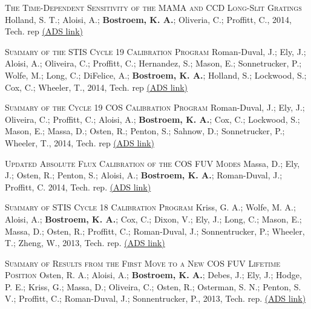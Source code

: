 \begin{revnumerate}[24]
\item{\textsc{The Time-Dependent Sensitivity of the MAMA and CCD Long-Slit Gratings}
Holland, S. T.; Aloisi, A.; {\bf Bostroem, K. A.}; Oliveria, C.; Proffitt, C.,  2014, Tech. rep 
\color{blue}\href{https://ui.adsabs.harvard.edu/#abs/2014stis.rept....2H/abstract}{(ADS link)}\color{black}}\\ %

\item{\textsc{Summary of the STIS Cycle 19 Calibration Program}
Roman-Duval, J.; Ely, J.; Aloisi, A.; Oliveira, C.; Proffitt, C.; Hernandez, S.; Mason, E.; Sonnetrucker, P.; Wolfe, M.; Long, C.; DiFelice, A.; \textbf{Bostroem, K. A.}; Holland, S.; Lockwood, S.; Cox, C.; Wheeler, T., 2014, Tech. rep 
\color{blue}\href{https://ui.adsabs.harvard.edu/#abs/2014stis.rept....1R/abstract}{(ADS link)}\color{black}}\\ %

\item{\textsc{Summary of the Cycle 19 COS Calibration Program}
Roman-Duval, J.; Ely, J.; Oliveira, C.; Proffitt, C.; Aloisi, A.; \textbf{Bostroem, K. A.}; Cox, C.; Lockwood, S.; Mason, E.; Massa, D.; Osten, R.; Penton, S.; Sahnow, D.; Sonnetrucker, P.; Wheeler, T., 2014, Tech. rep 
\color{blue}\href{https://ui.adsabs.harvard.edu/#abs/2014cos..rept....1R/abstract}{(ADS link)}\color{black}}\\ %

\item{\textsc{Updated Absolute Flux Calibration of the COS FUV Modes} 
Massa, D.; Ely, J.; Osten, R.; Penton, S.; Aloisi, A.; \textbf{Bostroem, K. A.}; Roman-Duval, J.; Proffitt, C. 2014, Tech. rep. 
\color{blue}\href{https://ui.adsabs.harvard.edu/#abs/2014cos..rept....9M/abstract}{(ADS link)}\color{black}}\\ %

\item{\textsc{Summary of STIS Cycle 18 Calibration Program} 
Kriss, G. A.; Wolfe, M. A.; Aloisi, A.; \textbf{Bostroem, K. A.}; Cox, C.; Dixon, V.; Ely, J.; Long, C.; Mason, E.; Massa, D.; Osten, R.; Proffitt, C.; Roman-Duval, J.; Sonnentrucker, P.; Wheeler, T.; Zheng, W., 2013, Tech. rep. 
\color{blue}\href{https://ui.adsabs.harvard.edu/#abs/2013stis.rept....3K/abstract}{(ADS link)}\color{black}}\\ %

\item{\textsc{Summary of Results from the First Move to a New COS FUV Lifetime Position}
Osten, R. A.; Aloisi, A.; \textbf{Bostroem, K. A.};  Debes, J.; Ely, J.; Hodge, P. E.; Kriss, G.; Massa, D.; Oliveira, C.; Osten, R.; Osterman, S. N.; Penton, S. V.; Proffitt, C.; Roman-Duval, J.; Sonnentrucker, P., 2013, Tech. rep. 
\color{blue}\href{https://ui.adsabs.harvard.edu/#abs/2013cos..rept...16O/abstract}{(ADS link)}\color{black}}\\ %


\end{revnumerate}
